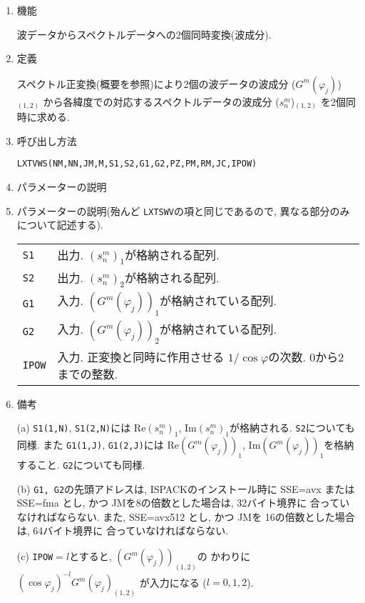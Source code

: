 \documentclass[a4j]{jarticle}
\begin{document}
\begin{enumerate}

\item 機能 

波データからスペクトルデータへの2個同時変換(波成分).

\item 定義

スペクトル正変換(概要を参照)により2個の波データの波成分
($G^m(\varphi_j)$)$_{(1,2)}$
から各緯度での対応するスペクトルデータの波成分
($s^m_n$)$_{(1,2)}$
を2個同時に求める.

\item 呼び出し方法 

\texttt{LXTVWS(NM,NN,JM,M,S1,S2,G1,G2,PZ,PM,RM,JC,IPOW)}
  
\item パラメーターの説明

\item パラメーターの説明(殆んど \texttt{LXTSWV}の項と同じであるので,
異なる部分のみについて記述する).
  
\begin{tabular}{ll}
\texttt{S1} & 出力. $(s^m_n)_1$が格納される配列.\\
\texttt{S2} & 出力. $(s^m_n)_2$が格納される配列.\\
\texttt{G1} & 入力. $(G^m(\varphi_j))_1$が格納されている配列.\\
\texttt{G2} & 入力.  $(G^m(\varphi_j))_2$が格納されている配列.\\
\texttt{IPOW} & 入力. 正変換と同時に作用させる
                      $1/\cos\varphi$の次数. 0から2までの整数.
\end{tabular}

\item 備考

  (a) \texttt{S1(1,N)}, \texttt{S1(2,N)}には
  $\mbox{Re}(s^m_n)_1$, $\mbox{Im}(s^m_n)_1$が格納される.
  \texttt{S2}についても同様.
  また
\texttt{G1(1,J)}, \texttt{G1(2,J)}には  $\mbox{Re}(G^m(\varphi_j))_1$, 
$\mbox{Im}(G^m(\varphi_j))_1$を格納すること. \texttt{G2}についても同様.
  
(b) \texttt{G1, G2}の先頭アドレスは, 
ISPACKのインストール時に SSE=avx または SSE=fma とし, かつ
JMを8の倍数とした場合は, 32バイト境界に
合っていなければならない.
また, SSE=avx512 とし, かつ
JMを 16の倍数とした場合は, 64バイト境界に
合っていなければならない.

(c) \texttt{IPOW}$=l$とすると, $(G^m(\varphi_j))_{(1,2)}$の
    かわりに $(\cos\varphi_j)^{-l}G^m(\varphi_j)_{(1,2)}$ が入力になる
    ($l=0,1,2$).

\end{enumerate}
\end{document}
